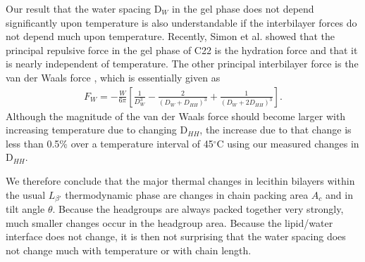 Our result that the water spacing D$_{W}$ in the gel phase does not depend 
significantly upon temperature is also understandable if
the interbilayer forces do not depend much upon temperature.  
Recently, Simon et al. \cite{Simon95} showed that the principal 
repulsive force 
in the gel phase of C22 is the hydration force and that it is nearly
independent of temperature.  The other principal interbilayer force is the
van der Waals force \cite{Isr85}, which is essentially given as
\begin{eqnarray}
\label{vdw}
F_W = - \frac{W}{6 \pi} [ \frac{1}{D_{W}^3}
- \frac{2}{(D_{W}+D_{HH})^3} + \frac{1}{(D_{W} + 2D_{HH})^3} ].
\end{eqnarray}
Although the magnitude of the van der Waals force should become larger
with increasing temperature due to changing D$_{HH}$, the increase 
due to that change is
less than 0.5\% over a temperature interval of 45$^{\circ}$C
using our measured changes in D$_{HH}$.

We therefore conclude that the major thermal changes in lecithin
bilayers within the usual $L_{\beta '}$ thermodynamic phase are 
changes in chain packing area $A_c$ and in tilt angle $\theta$.
Because the headgroups are always packed together very strongly, much smaller
changes occur in the headgroup area. Because the lipid/water
interface does not change, it is then not
surprising that the water spacing does not change much with
temperature or with chain length.
